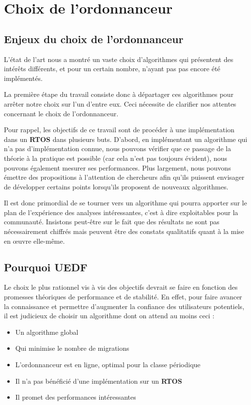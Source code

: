 	\section{Choix de l'ordonnanceur}
	

	\subsection{Enjeux du choix de l'ordonnanceur}
	
	L'état de l'art nous a montré un vaste choix d'algorithmes qui présentent 
	des intérêts différents, et pour un certain nombre, 
	n'ayant pas pas encore été implémentés. \newline
	
	La première étape du travail consiste donc à départager ces algorithmes pour arrêter notre choix sur l'un d'entre eux. Ceci nécessite de clarifier nos attentes concernant le choix de l'ordonnanceur.\newline
	
	Pour rappel, les objectifs de ce travail sont de procéder à une implémentation dans 
	un \textbf{RTOS} dans plusieurs buts. 
	D'abord, en implémentant un algorithme qui n'a pas d'implémentation connue, nous 
	pouvons vérifier que ce passage de la théorie à la pratique est possible (car cela n'est pas 
	toujours évident), nous pouvons également mesurer ses performances. 
	Plus largement, nous pouvons émettre des propositions à l'attention de chercheurs 
	afin qu'ils puissent envisager de développer certains points lorsqu'ils proposent de nouveaux algorithmes. \newline
	
	Il est donc primordial de se tourner vers un algorithme qui pourra apporter sur le plan de 
	l'expérience des analyses intéressantes, c'est à dire exploitables pour la communauté. 
	Insistons peut-être sur le fait que des résultats ne sont pas nécessairement chiffrés mais 
	peuvent être des constats qualitatifs quant à la mise en œuvre elle-même.\newline
	
	\subsection{Pourquoi UEDF}
	
	Le choix le plus rationnel vis à vis des objectifs devrait se faire en fonction des 
	promesses théoriques de performance et de stabilité. 
	En effet, pour faire avancer la connaissance et permettre d'augmenter la confiance des utilisateurs 
	potentiels, il est judicieux de choisir un algorithme dont on attend au moins ceci :
	\begin{itemize}
		\item Un algorithme global
		\item Qui minimise le nombre de migrations
		\item L'ordonnanceur est en ligne, optimal pour la classe périodique
		\item Il n'a pas bénéficié d'une implémentation sur un \textbf{RTOS}
		\item Il promet des performances intéressantes
	\end{itemize}
	
